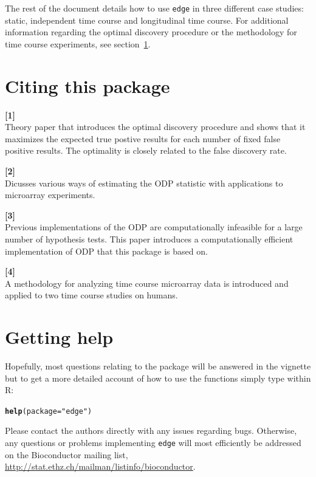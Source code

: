 \documentclass{article}\usepackage[]{graphicx}\usepackage[]{color}
\makeatletter
\newcommand{\hlstr}[1]{\textcolor[rgb]{0.192,0.494,0.8}{#1}}%
\newcommand{\hlstd}[1]{\textcolor[rgb]{0.345,0.345,0.345}{#1}}%
\newcommand{\hlkwc}[1]{\textcolor[rgb]{0.333,0.667,0.333}{#1}}%
\newcommand{\hlkwd}[1]{\textcolor[rgb]{0.737,0.353,0.396}{\textbf{#1}}}%
\newenvironment{kframe}{%
 \def\at@end@of@kframe{}%
 \ifinner\ifhmode%
  \def\at@end@of@kframe{\end{minipage}}%
  \begin{minipage}{\columnwidth}%
 \fi\fi%
 \def\FrameCommand##1{\hskip\@totalleftmargin \hskip-\fboxsep
 \colorbox{shadecolor}{##1}\hskip-\fboxsep
     \hskip-\linewidth \hskip-\@totalleftmargin \hskip\columnwidth}%
 \MakeFramed {\advance\hsize-\width
   \@totalleftmargin\z@ \linewidth\hsize
   \@setminipage}}%
 {\par\unskip\endMakeFramed%
 \at@end@of@kframe}
\newenvironment{knitrout}{}{} %
\makeatother
\begin{document}
The rest of the document details how to use {\tt edge} in three different case studies: static, independent time course and longitudinal time course. For additional information regarding the optimal discovery procedure or the \cite{storey:2005} methodology for time course experiments, see section~\ref{sec:citepackage}.

\section{Citing this package}
\label{sec:citepackage}
\textbf{[1] } \\
Theory paper that introduces the optimal discovery procedure and shows that it maximizes the expected true postive results for each number of fixed false positive results. The optimality is closely related to the false discovery rate.

\textbf{[2] } \\
Dicusses various ways of estimating the ODP statistic with applications to microarray experiments.

\textbf{[3] } \\
Previous implementations of the ODP are computationally infeasible for a large number of hypothesis tests. This paper introduces a computationally efficient implementation of ODP that this package is based on.

\textbf{[4] } \\
A methodology for analyzing time course microarray data is introduced and applied to two time course studies on humans. 

\section{Getting help}
Hopefully, most questions relating to the package will be answered in the vignette but to get a more detailed account of how to use the functions simply type within R:
\begin{knitrout}
\color{fgcolor}\begin{kframe}
\begin{alltt}
\hlkwd{help}\hlstd{(}\hlkwc{package} \hlstd{=} \hlstr{"edge"}\hlstd{)}
\end{alltt}
\end{kframe}
\end{knitrout}
\noindent Please contact the authors directly with any issues regarding bugs. Otherwise, any questions or problems implementing {\tt edge} will most efficiently be addressed on the Bioconductor mailing list, \url{http://stat.ethz.ch/mailman/listinfo/bioconductor}.
\end{document}
